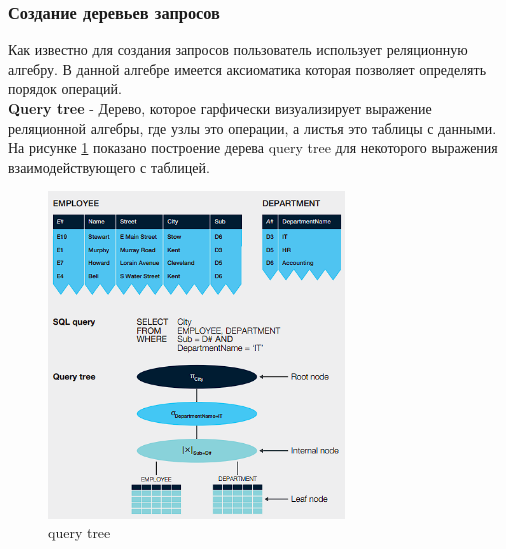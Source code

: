 \documentclass{article}
\begin{document}
\subsubsection{Создание деревьев запросов}
Как известно для создания запросов пользователь использует реляционную алгебру. В данной алгебре имеется аксиоматика которая позволяет определять порядок операций.\\
\textbf{Query tree} - Дерево, которое гарфически визуализирует выражение реляционной алгебры, где узлы это операции, а листья это таблицы с данными.\\
На рисунке \ref{img5} показано построение дерева query tree для некоторого выражения взаимодействующего с таблицей.
\begin{figure}[ht]
    \centering
    \includegraphics[width=0.7\textwidth]{images/query_tree.png}
    \caption{query tree}
    \label{img5}
\end{figure}
\end{document}
